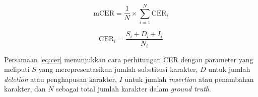 \begin{equation}
    \label{eq:mcer}
\text{mCER} = \frac{1}{N} \times \sum_{i=1}^{N} \text{CER}_i
\end{equation}

\begin{equation}
    \label{eq:cer}
\text{CER}_i = \frac{S_i + D_i + I_i}{N_i}
\end{equation}

Persamaan \eqref{eq:cer} menunjukkan cara perhitungan CER dengan parameter yang meliputi $S$ yang merepresentasikan jumlah substitusi karakter, $D$ untuk jumlah \emph{deletion} atau penghapusan karakter, $I$ untuk jumlah \emph{insertion} atau penambahan karakter, dan $N$ sebagai total jumlah karakter dalam \emph{ground truth}.





